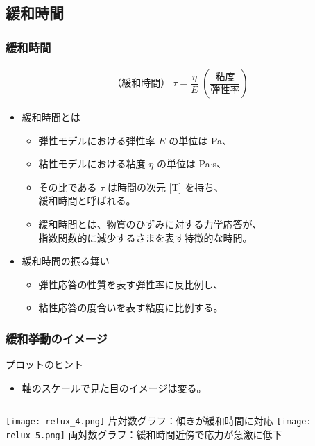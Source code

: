 \documentclass[12pt, dvipdfmx]{beamer}
\begin{document}
\subsection{緩和時間}
\begin{frame}
	\frametitle{緩和時間}
		\begin{align*}
			\text{（緩和時間）}\;\tau = \dfrac{\eta}{E}\; \left( \dfrac{\text{粘度}}{\text{弾性率}} \right)
		\end{align*}
		\vspace{-3mm}
		\begin{itemize}
			\item 緩和時間とは
			\begin{itemize}
				\item 弾性モデルにおける弾性率 $E$ の単位は Pa、
				\item 粘性モデルにおける粘度 $\eta$ の単位は Pa$\cdot$s、
				\item その比である $\tau$ は時間の次元 [T] を持ち、\\緩和時間と呼ばれる。
				\item 緩和時間とは、物質のひずみに対する力学応答が、\\指数関数的に減少するさまを表す特徴的な時間。
			\end{itemize}
			\item 緩和時間の振る舞い
			\begin{itemize}
				\item 弾性応答の性質を表す弾性率に反比例し、
				\item 粘性応答の度合いを表す粘度に比例する。
			\end{itemize}
		\end{itemize}
\end{frame}

\begin{frame}
	\frametitle{緩和挙動のイメージ}
		\begin{alertblock}{プロットのヒント}
			\begin{itemize}
				\item 軸のスケールで見た目のイメージは変る。
			\end{itemize}
		\end{alertblock}
		\begin{columns}[T, onlytextwidth]
				\texttt{[image: relux\_4.png]}
				片対数グラフ：傾きが緩和時間に対応
				\texttt{[image: relux\_5.png]}
				両対数グラフ：緩和時間近傍で応力が急激に低下
		\end{columns}
\end{frame}
\end{document}
